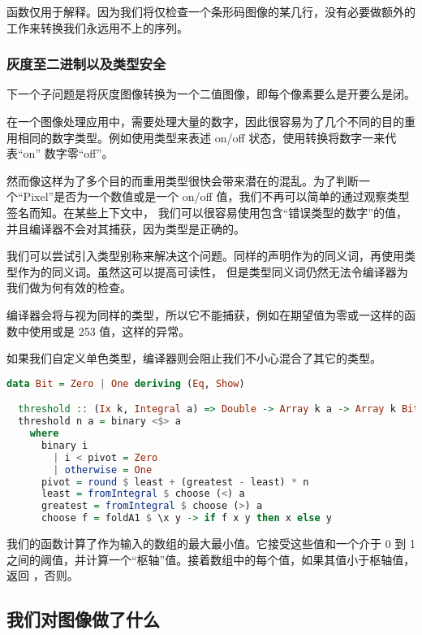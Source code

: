 \documentclass[./main.tex]{subfiles}
\begin{document}
函数仅用于解释。因为我们将仅检查一个条形码图像的某几行，没有必要做额外的工作来转换我们永远用不上的序列。

\subsubsection*{灰度至二进制以及类型安全}

下一个子问题是将灰度图像转换为一个二值图像，即每个像素要么是开要么是闭。

在一个图像处理应用中，需要处理大量的数字，因此很容易为了几个不同的目的重用相同的数字类型。例如使用类型来表述 on/off 状态，使用转换将数字一来代表“on”
数字零“off”。

然而像这样为了多个目的而重用类型很快会带来潜在的混乱。为了判断一个“Pixel”是否为一个数值或是一个 on/off 值，我们不再可以简单的通过观察类型签名而知。在某些上下文中，
我们可以很容易使用包含“错误类型的数字”的值，并且编译器不会对其捕获，因为类型是正确的。

我们可以尝试引入类型别称来解决这个问题。同样的声明作为的同义词，再使用类型作为的同义词。虽然这可以提高可读性，
但是类型同义词仍然无法令编译器为我们做为何有效的检查。

编译器会将与视为同样的类型，所以它不能捕获，例如在期望值为零或一这样的函数中使用或是 253 值，这样的异常。

如果我们自定义单色类型，编译器则会阻止我们不小心混合了其它的类型。

\begin{lstlisting}[language=Haskell]
  data Bit = Zero | One deriving (Eq, Show)

  threshold :: (Ix k, Integral a) => Double -> Array k a -> Array k Bit
  threshold n a = binary <$> a
    where
      binary i
        | i < pivot = Zero
        | otherwise = One
      pivot = round $ least + (greatest - least) * n
      least = fromIntegral $ choose (<) a
      greatest = fromIntegral $ choose (>) a
      choose f = foldA1 $ \x y -> if f x y then x else y
\end{lstlisting}

我们的函数计算了作为输入的数组的最大最小值。它接受这些值和一个介于 0 到 1 之间的阈值，并计算一个“枢轴”值。接着数组中的每个值，如果其值小于枢轴值，返回
，否则。

\subsection*{我们对图像做了什么}
\end{document}
